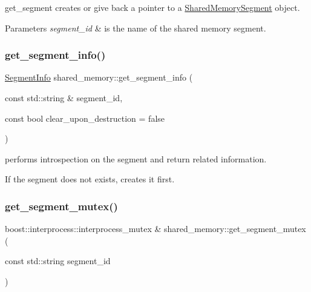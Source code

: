 get\+\_\+segment creates or give back a pointer to a \hyperlink{classshared__memory_1_1SharedMemorySegment}{Shared\+Memory\+Segment} object. 


\begin{DoxyParams}{Parameters}
{\em segment\+\_\+id} & is the name of the shared memory segment. \\
\hline
\end{DoxyParams}
\mbox{\label{namespaceshared__memory_a70f7613a247615e323cab083934c803e}} 
\subsubsection{\texorpdfstring{get\+\_\+segment\+\_\+info()}{get\_segment\_info()}}
{\footnotesize\ttfamily \hyperlink{classshared__memory_1_1SegmentInfo}{Segment\+Info} shared\+\_\+memory\+::get\+\_\+segment\+\_\+info (\begin{DoxyParamCaption}\item[{const std\+::string \&}]{segment\+\_\+id,  }\item[{const bool}]{clear\+\_\+upon\+\_\+destruction = {\ttfamily false} }\end{DoxyParamCaption})}



performs introspection on the segment and return related information. 

If the segment does not exists, creates it first. \mbox{\label{namespaceshared__memory_aed33c9701140a1c43e40f182a380199b}} 
\subsubsection{\texorpdfstring{get\+\_\+segment\+\_\+mutex()}{get\_segment\_mutex()}}
{\footnotesize\ttfamily boost\+::interprocess\+::interprocess\+\_\+mutex \& shared\+\_\+memory\+::get\+\_\+segment\+\_\+mutex (\begin{DoxyParamCaption}\item[{const std\+::string}]{segment\+\_\+id }\end{DoxyParamCaption})}



